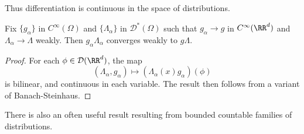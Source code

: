 Thus differentiation is continuous in the space of distributions.

\begin{theorem}
  Fix $\{ g_\alpha \}$ in $C^\infty(\Omega)$ and $\{ \Lambda_\alpha \}$ in $\mathcal{D}^*(\Omega)$ such that $g_\alpha \to g$ in $C^\infty(\RR^d)$ and $\Lambda_\alpha \to \Lambda$ weakly. Then $g_\alpha \Lambda_\alpha$ converges weakly to $g \Lambda$.
\end{theorem}
\begin{proof}
  For each $\phi \in \mathcal{D}(\RR^d)$, the map
  \[ (\Lambda_\alpha, g_\alpha) \mapsto (\Lambda_\alpha(x) g_\alpha)(\phi) \]
  is bilinear, and continuous in each variable. The result then follows from a variant of Banach-Steinhaus.
\end{proof}

There is also an often useful result resulting from bounded countable families of distributions.

